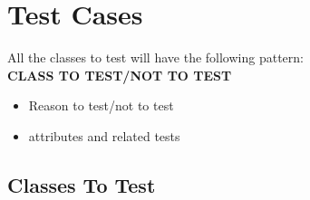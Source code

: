 \documentclass[12pt]{report}
\begin{document}
\section{Test Cases}
    All the classes to test will have the following pattern:\\
    
    \textbf{CLASS TO TEST/NOT TO TEST}
    \begin{itemize}
        \item Reason to test/not to test
        \item attributes and related tests
    \end{itemize}
    
    \subsection{Classes To Test}
\end{document}
